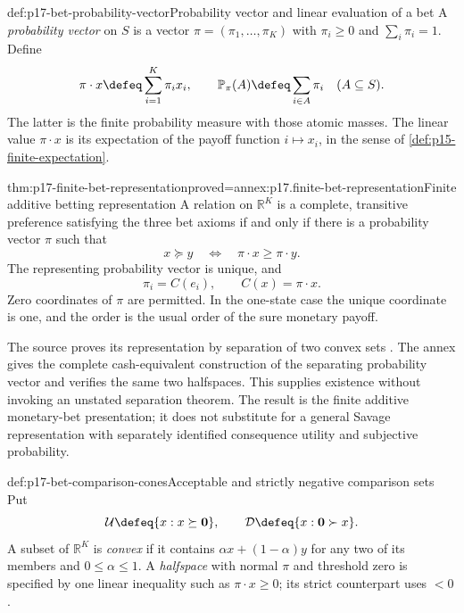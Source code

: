 \begin{hbdefinition}{def:p17-bet-probability-vector}{Probability vector and linear evaluation of a bet}
A \emph{probability vector} on \(S\) is a vector
\(\pi=(\pi_1,\ldots,\pi_K)\) with \(\pi_i\geq0\) and
\(\sum_i\pi_i=1\). Define
\[
                 \pi\cdot x\defeq\sum_{i=1}^K\pi_i x_i,
       \qquad \mathbb P_\pi(A)\defeq\sum_{i\in A}\pi_i
                                      \quad(A\subseteq S).
\]
The latter is the finite probability measure with those atomic masses.
The linear value \(\pi\cdot x\) is its expectation of the payoff
function \(i\mapsto x_i\), in the sense of
\cref{def:p15-finite-expectation}.
\end{hbdefinition}

\begin{hbtheorem}{thm:p17-finite-bet-representation}{proved=annex:p17.finite-bet-representation}{Finite additive betting representation}
A relation on \(\mathbb R^K\) is a complete, transitive preference
satisfying the three bet axioms if and only if there is a probability
vector \(\pi\) such that
\[
                   x\succeq y
                      \quad\Longleftrightarrow\quad
                   \pi\cdot x\geq\pi\cdot y.
\]
The representing probability vector is unique, and
\[
                        \pi_i=C(e_i),\qquad C(x)=\pi\cdot x.
\]
Zero coordinates of \(\pi\) are permitted. In the one-state case
the unique coordinate is one, and the order is the usual order of
the sure monetary payoff.
\end{hbtheorem}

The source proves its representation by separation of two convex sets
\cite[p.~103]{Rubinstein2015LectureNotes}.
The annex gives the complete cash-equivalent construction of the
separating probability vector and verifies the same two halfspaces.
This supplies existence without invoking an unstated separation theorem.
The result is the finite additive monetary-bet presentation; it does
not substitute for a general Savage representation with separately
identified consequence utility and subjective probability.

\begin{hbdefinition}{def:p17-bet-comparison-cones}{Acceptable and strictly negative comparison sets}
Put
\[
 \mathcal U\defeq\{x:x\succeq\mathbf0\},\qquad
 \mathcal D\defeq\{x:\mathbf0\succ x\}.
\]
A subset of \(\mathbb R^K\) is \emph{convex} if it contains
\(\alpha x+(1-\alpha)y\) for any two of its members and
\(0\leq\alpha\leq1\). A \emph{halfspace} with normal \(\pi\)
and threshold zero is specified by one linear inequality such as
\(\pi\cdot x\geq0\); its strict counterpart uses \(<0\).
\end{hbdefinition}

